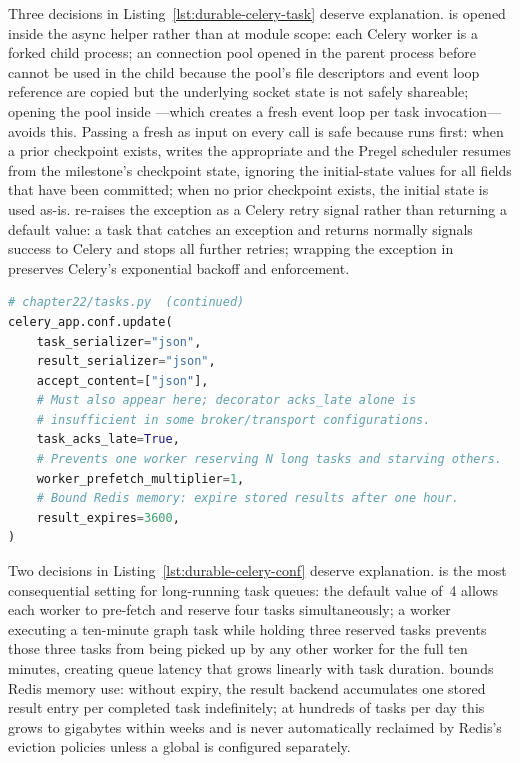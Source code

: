 Three decisions in Listing~\ref{lst:durable-celery-task} deserve
explanation.
 is opened inside the async 
helper rather than at module scope: each Celery  worker is
a forked child process; an  connection pool opened in the
parent process before  cannot be used in the child because
the pool's file descriptors and event loop reference are copied but the
underlying socket state is not safely shareable; opening the pool inside
---which creates a fresh event loop per task
invocation---avoids this. Passing a fresh 
as input on every call is safe because  runs first:
when a prior checkpoint exists,  writes the
appropriate  and the Pregel scheduler resumes from the
milestone's checkpoint state, ignoring the initial-state values for all
fields that have been committed; when no prior checkpoint exists,
the initial state is used as-is.  re-raises
the exception as a Celery retry signal rather than returning a default
value: a task that catches an exception and returns normally signals
success to Celery and stops all further retries; wrapping the exception
in  preserves Celery's exponential backoff and
 enforcement.

\begin{lstlisting}[language=Python,
  caption={Celery configuration block: acks\_late enforcement,
           prefetch multiplier, result expiry},
  label={lst:durable-celery-conf}]
# chapter22/tasks.py  (continued)
celery_app.conf.update(
    task_serializer="json",
    result_serializer="json",
    accept_content=["json"],
    # Must also appear here; decorator acks_late alone is
    # insufficient in some broker/transport configurations.
    task_acks_late=True,
    # Prevents one worker reserving N long tasks and starving others.
    worker_prefetch_multiplier=1,
    # Bound Redis memory: expire stored results after one hour.
    result_expires=3600,
)
\end{lstlisting}

Two decisions in Listing~\ref{lst:durable-celery-conf} deserve
explanation.
 is the most consequential setting
for long-running task queues: the default value of~4 allows each worker
to pre-fetch and reserve four tasks simultaneously; a worker executing a
ten-minute graph task while holding three reserved tasks prevents those
three tasks from being picked up by any other worker for the full ten
minutes, creating queue latency that grows linearly with task duration.
 bounds Redis memory use: without expiry,
the result backend accumulates one stored result entry per completed task
indefinitely; at hundreds of tasks per day this grows to gigabytes within
weeks and is never automatically reclaimed by Redis's eviction policies
unless a global  is configured separately.

